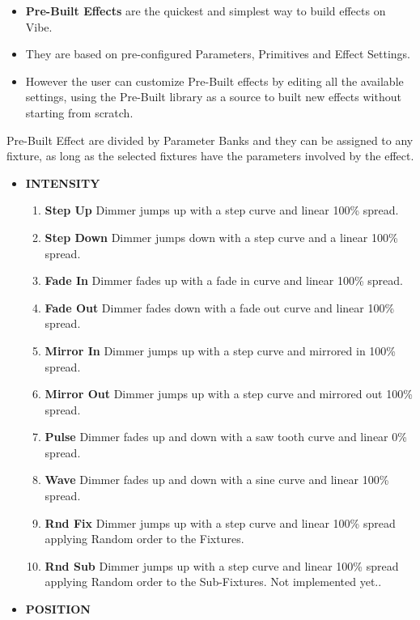 \documentclass[
]{article}
\begin{document}
\begin{itemize}
\item
  \textbf{Pre-Built Effects} are the quickest and simplest way to build effects on Vibe.
\item
  They are based on pre-configured Parameters, Primitives and Effect Settings.
\item
  However the user can customize Pre-Built effects by editing all the available settings, using the Pre-Built library as a source to built new effects without starting from scratch.
\end{itemize}

Pre-Built Effect are divided by Parameter Banks and they can be assigned to any fixture, as long as the selected fixtures have the parameters involved by the effect.

\begin{itemize}
\item
  \textbf{INTENSITY}

  \begin{enumerate}
  \def\labelenumi{\arabic{enumi}.}
  \item
    \textbf{Step Up} Dimmer jumps up with a step curve and linear 100\% spread.
  \item
    \textbf{Step Down} Dimmer jumps down with a step curve and a linear 100\% spread.
  \item
    \textbf{Fade In} Dimmer fades up with a fade in curve and linear 100\% spread.
  \item
    \textbf{Fade Out} Dimmer fades down with a fade out curve and linear 100\% spread.
  \item
    \textbf{Mirror In} Dimmer jumps up with a step curve and mirrored in 100\% spread.
  \item
    \textbf{Mirror Out} Dimmer jumps up with a step curve and mirrored out 100\% spread.
  \item
    \textbf{Pulse} Dimmer fades up and down with a saw tooth curve and linear 0\% spread.
  \item
    \textbf{Wave} Dimmer fades up and down with a sine curve and linear 100\% spread.
  \item
    \textbf{Rnd Fix} Dimmer jumps up with a step curve and linear 100\% spread applying Random order to the Fixtures.
  \item
    \textbf{Rnd Sub} Dimmer jumps up with a step curve and linear 100\% spread applying Random order to the Sub-Fixtures. {Not implemented yet.}.
  \end{enumerate}
\item
  \textbf{POSITION}


\end{itemize}
\end{document}
